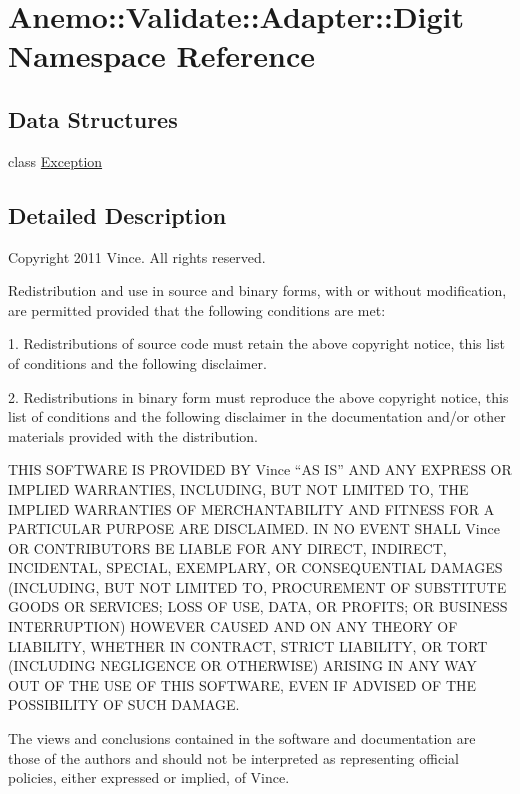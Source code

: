 \hypertarget{namespace_anemo_1_1_validate_1_1_adapter_1_1_digit}{
\section{Anemo::Validate::Adapter::Digit Namespace Reference}
\label{namespace_anemo_1_1_validate_1_1_adapter_1_1_digit}
}
\subsection*{Data Structures}
\begin{DoxyCompactItemize}
\item 
class \hyperlink{class_anemo_1_1_validate_1_1_adapter_1_1_digit_1_1_exception}{Exception}
\end{DoxyCompactItemize}


\subsection{Detailed Description}
Copyright 2011 Vince. All rights reserved.

Redistribution and use in source and binary forms, with or without modification, are permitted provided that the following conditions are met:

1. Redistributions of source code must retain the above copyright notice, this list of conditions and the following disclaimer.

2. Redistributions in binary form must reproduce the above copyright notice, this list of conditions and the following disclaimer in the documentation and/or other materials provided with the distribution.

THIS SOFTWARE IS PROVIDED BY Vince ``AS IS'' AND ANY EXPRESS OR IMPLIED WARRANTIES, INCLUDING, BUT NOT LIMITED TO, THE IMPLIED WARRANTIES OF MERCHANTABILITY AND FITNESS FOR A PARTICULAR PURPOSE ARE DISCLAIMED. IN NO EVENT SHALL Vince OR CONTRIBUTORS BE LIABLE FOR ANY DIRECT, INDIRECT, INCIDENTAL, SPECIAL, EXEMPLARY, OR CONSEQUENTIAL DAMAGES (INCLUDING, BUT NOT LIMITED TO, PROCUREMENT OF SUBSTITUTE GOODS OR SERVICES; LOSS OF USE, DATA, OR PROFITS; OR BUSINESS INTERRUPTION) HOWEVER CAUSED AND ON ANY THEORY OF LIABILITY, WHETHER IN CONTRACT, STRICT LIABILITY, OR TORT (INCLUDING NEGLIGENCE OR OTHERWISE) ARISING IN ANY WAY OUT OF THE USE OF THIS SOFTWARE, EVEN IF ADVISED OF THE POSSIBILITY OF SUCH DAMAGE.

The views and conclusions contained in the software and documentation are those of the authors and should not be interpreted as representing official policies, either expressed or implied, of Vince. 